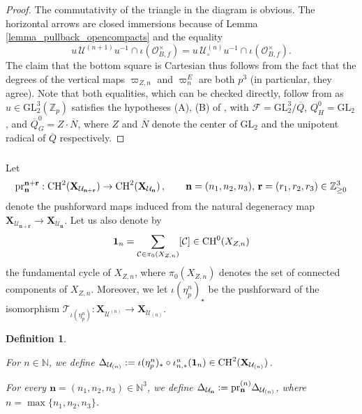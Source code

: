 \documentclass{amsart}
\numberwithin{equation}{section}
\newtheorem{defn}[theorem]{Definition}
\newcommand{\Zp}{\mathbb{Z}_p}
\newcommand{\ZZ}{\mathbb{Z}}
\newcommand{\cO}{\mathcal{O}}
\newcommand{\GL}{\mathrm{GL}}
\begin{document}
\begin{proof}
The commutativity of the triangle in the diagram is obvious. The horizontal arrows are closed immersions because of Lemma \ref{lemma_pullback_opencompacts} and the equality \[ u\, \mathcal{U}^{(n+1)} u^{-1} \cap \iota(\cO_{B,f}^\times) = u \, \mathcal{U}^{(n)}_\circ u^{-1} \cap \iota(\cO_{B,f}^\times).\] The claim that the bottom square is Cartesian thus follows from the fact that the degrees of the vertical maps $\varpi_{Z,n} $ and $\varpi_n^{E}$ are both $p^3$ (in particular, they agree). Note that both equalities, which can be checked directly, follow from \cite[Lemma 4.4.1]{LoefflerSpherical} as $u \in \GL_2^3(\Zp)$ satisfies the hypotheses (A), (B) of \cite[\S 4.3]{LoefflerSpherical}, with $\mathcal{F}=\GL_2^3/\overline{Q}$,  $Q^0_H = \GL_2$, and $\overline{Q}^0_G=Z \cdot \overline{N}$, where $Z$ and $\overline{N}$ denote the center of $\GL_2$ and the unipotent radical of $\overline{Q}$ respectively. 
\end{proof}


\subsubsection{} Let 
$${\rm pr}^{\mathbf{n}+\mathbf{r}}_{\mathbf{n}}:{\rm CH}^2(\mathbf{X}_{\mathcal{U}_{\mathbf{n+r}}}) \to {\rm CH}^2(\mathbf{X}_{\mathcal{U}_{\mathbf{n}}})\,,\qquad \mathbf{n}=(n_1,n_2,n_3), \, \mathbf{r}=(r_1,r_2,r_3)\in \ZZ_{\geq 0}^3$$
denote the pushforward maps induced from the natural degeneracy map $\mathbf{X}_{\mathcal{U}_{\mathbf{n+r}}}\xrightarrow{} \mathbf{X}_{\mathcal{U}_{\mathbf{n}}}$. Let us also denote by 
$$\mathbf{1}_{n}= \sum_{\mathcal{C} \in \pi_0(X_{Z,n})} [\mathcal{C}] \in {\rm CH}^0(X_{Z,n})$$  
the fundamental cycle of $X_{Z,n}$, where $\pi_0(X_{Z,n})$ denotes the set of connected components of $X_{Z,n}$. Moreover, we let $\iota(\eta_p^n)_\star$ be the pushforward of the isomorphism $\mathcal{T}_{\iota(\eta_p^n)}: \mathbf{X}_{\mathcal{U}^{(n)}} \to \mathbf{X}_{\mathcal{U}_{(n)}}$.

\begin{defn}\label{def_2025_07_03_1206}
    \item[i)] For $n \in \mathbb N$, we define $\Delta_{\mathcal{U}_{(n)}} := \iota(\eta_p^n)_\ast \circ \iota_{n,\ast}^u(\mathbf{1}_{n}) \in {\rm CH}^2(\mathbf{X}_{\mathcal{U}_{(n)}})$.        
    \item[ii)]    For every ${\mathbf{n} } = (n_1,n_2,n_3) \in \mathbb N^3$, we define $\Delta_{\mathcal{U}_{\mathbf{n}}} : = {\rm pr}^{(n)}_{\mathbf{n}} \Delta_{\mathcal{U}_{(n)}} $, where $n = \max \{ n_1,n_2,n_3 \}$.
\end{defn}
\end{document}

